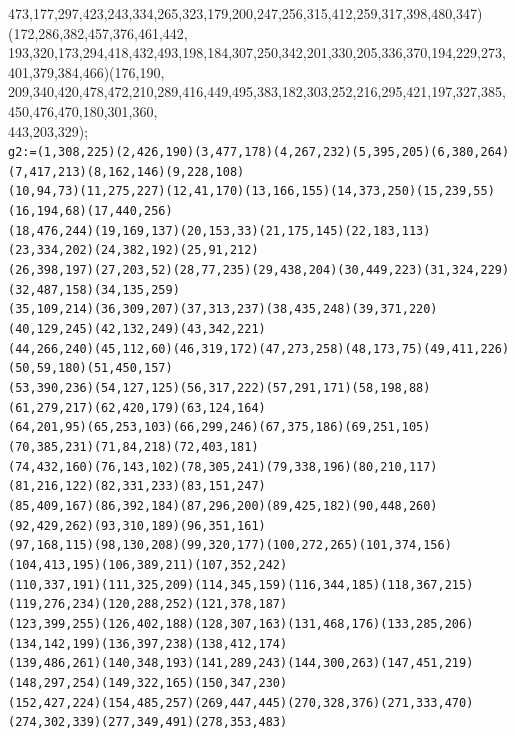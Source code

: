 \documentclass[a4paper,twopage,reqno,12pt]{amsart}
\theoremstyle{definition}
\numberwithin{equation}{section}
\begin{document}
\begin{enumerate}
{{473,177,297,423,243,334,265,323,179,200,247,256,315,412,259,317,398,480,347)(172,286,382,457,376,461,442,\\
193,320,173,294,418,432,493,198,184,307,250,342,201,330,205,336,370,194,229,273,401,379,384,466)(176,190,
\\209,340,420,478,472,210,289,416,449,495,383,182,303,252,216,295,421,197,327,385,450,476,470,180,301,360,\\
443,203,329);}\\
\texttt{g2:=(1,308,225)(2,426,190)(3,477,178)(4,267,232)(5,395,205)(6,380,264)(7,417,213)(8,162,146)(9,228,108)\\
(10,94,73)(11,275,227)(12,41,170)(13,166,155)(14,373,250)(15,239,55)(16,194,68)(17,440,256)\\
(18,476,244)(19,169,137)(20,153,33)(21,175,145)(22,183,113)(23,334,202)(24,382,192)(25,91,212)\\
(26,398,197)(27,203,52)(28,77,235)(29,438,204)(30,449,223)(31,324,229)(32,487,158)(34,135,259)\\
(35,109,214)(36,309,207)(37,313,237)(38,435,248)(39,371,220)(40,129,245)(42,132,249)(43,342,221)\\
(44,266,240)(45,112,60)(46,319,172)(47,273,258)(48,173,75)(49,411,226)(50,59,180)(51,450,157)\\
(53,390,236)(54,127,125)(56,317,222)(57,291,171)(58,198,88)(61,279,217)(62,420,179)(63,124,164)\\
(64,201,95)(65,253,103)(66,299,246)(67,375,186)(69,251,105)(70,385,231)(71,84,218)(72,403,181)\\
(74,432,160)(76,143,102)(78,305,241)(79,338,196)(80,210,117)(81,216,122)(82,331,233)(83,151,247)\\
(85,409,167)(86,392,184)(87,296,200)(89,425,182)(90,448,260)(92,429,262)(93,310,189)(96,351,161)\\
(97,168,115)(98,130,208)(99,320,177)(100,272,265)(101,374,156)(104,413,195)(106,389,211)(107,352,242)\\
(110,337,191)(111,325,209)(114,345,159)(116,344,185)(118,367,215)(119,276,234)(120,288,252)(121,378,187)\\
(123,399,255)(126,402,188)(128,307,163)(131,468,176)(133,285,206)(134,142,199)(136,397,238)(138,412,174)\\
(139,486,261)(140,348,193)(141,289,243)(144,300,263)(147,451,219)(148,297,254)(149,322,165)(150,347,230)\\
(152,427,224)(154,485,257)(269,447,445)(270,328,376)(271,333,470)(274,302,339)(277,349,491)(278,353,483)\\
}}
\end{enumerate}
\end{document}
